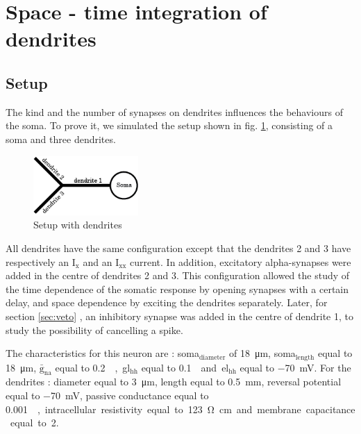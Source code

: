 \documentclass[a4paper, 10pt, conference]{ieeeconf}      %
\begin{document}
\section{Space - time integration of dendrites}


\subsection{Setup}
The kind and the number of synapses on dendrites influences the behaviours of the soma. To prove it, we simulated the setup shown in fig. \ref{fig:soma_dendrites}, consisting of a soma and three dendrites.

\begin{figure}
\begin{center}
\includegraphics[width=4cm]{figures/soma.png}
\end{center}

\caption{Setup with dendrites}
\label{fig:soma_dendrites}
\end{figure}


All dendrites have the same configuration except that the dendrites 2 and 3 have respectively an I$_\text{x}$ and an I$_\text{xx}$ current. In addition, excitatory alpha-synapses were added in the centre of dendrites 2 and 3. This configuration allowed the study of the time dependence of the somatic response by opening synapses with a certain delay, and space dependence by exciting the dendrites separately. Later, for section \ref{sec:veto} , an inhibitory synapse was added in the centre of dendrite 1, to study the possibility of cancelling a spike. 

The characteristics for this neuron are : soma$_\text{diameter}$ of \SI{18}{\micro\meter}, soma$_\text{length}$ equal to \SI{18}{\micro\meter}, $\bar{\text{g}}_\text{na}$ equal to \SI{0.2}{\siemens\per\centi\meter\square}, gl$_\text{hh}$ equal to \SI{0.1}{\milli\siemens\per\centi\meter\square} and el$_\text{hh}$ equal to \SI{-70}{\milli\volt}. For the dendrites : diameter equal to \SI{3}{\micro\meter}, length equal to \SI{0.5}{\milli\meter}, reversal potential equal to \SI{-70}{\milli\volt}, passive conductance equal to \SI{0.001}{\siemens\per\centi\meter\square}, intracellular resistivity equal to \SI{123}{\ohm\centi\meter} and membrane capacitance equal to \SI{2}{\micro\farad\per\centi\meter\square}. 
\end{document}
